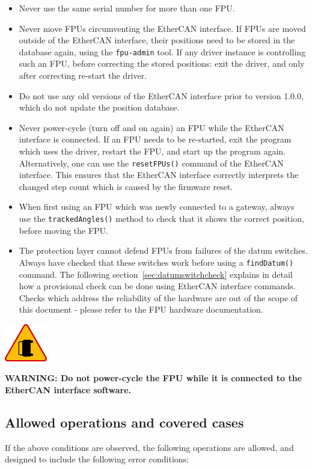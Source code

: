 \documentclass[11pt,a4paper]{scrartcl}
\newenvironment{warning}{\begin{framed}\includegraphics[width=5em]{accident-area-ahead.png}
}{\end{framed}}
\begin{document}
\begin{itemize}
  \item Never use the same serial number for more than one FPU.
  \item Never move FPUs circumventing the EtherCAN interface. If FPUs are moved
    outside of the EtherCAN interface, their positions need to be stored in the
    database again, using the \texttt{fpu-admin} tool. If any driver
    instance is controlling such an FPU, before correcting the stored
    positions: exit the driver, and only after correcting re-start the
    driver.
    
  \item Do not use any old versions of the EtherCAN interface prior to version
    1.0.0, which do not update the position database.
    
  \item Never power-cycle (turn off and on again) an FPU while the
    EtherCAN interface is connected. If an FPU needs to be re-started, exit the
    program which uses the driver, restart the FPU, and start up the
    program again.  Alternatively, one can use the
    \texttt{resetFPUs()} command of the EtherCAN interface. This ensures that the
    EtherCAN interface correctly interprets the changed step count which is caused
    by the firmware reset.
  \item When first using an FPU which was newly connected to a
    gateway, always use the \texttt{trackedAngles()} method to check
    that it shows the correct position, before moving the FPU.
  \item The protection layer cannot defend FPUs from failures of the
    datum switches. Always have checked that these switches work
    before using a \texttt{findDatum()} command. The following
    section~\ref{sec:datumswitchcheck} explains in detail how a
    provisional check can be done using EtherCAN interface commands. Checks which
    address the reliability of the hardware are out of the scope of
    this document - please refer to the FPU hardware documentation.
\end{itemize}

\begin{warning}
  \textbf{WARNING: Do not power-cycle the FPU while it is connected
    to the EtherCAN interface software.}
\end{warning}


\subsection{Allowed operations and covered cases}
If the above conditions are observed, the following operations are
allowed, and designed to include the following error conditions:
\end{document}
